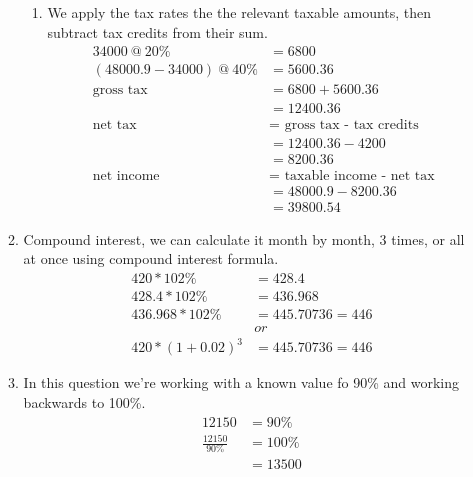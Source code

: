 \documentclass[11pt]{article}
\begin{document}
\begin{enumerate}
\begin{enumerate}
\begin{enumerate}
                    \item We apply the tax rates the the relevant taxable amounts, then subtract tax credits from their sum.
                        \begin{equation*}
                            \begin{split}
                                34000\ @\ 20\%&=6800\\
                                (48000.9-34000)\ @\ 40\%&=5600.36\\
                                \text{gross tax }&=6800+5600.36\\
                                &=12400.36\\
                                \text{net tax }&=\text{ gross tax - tax credits }\\
                                &=12400.36-4200\\
                                &=8200.36\\
                                \text{net income }&=\text{ taxable income - net tax}\\
                                &=48000.9-8200.36\\
                                &=39800.54
                            \end{split}
                        \end{equation*}
                \end{enumerate}
                \item Compound interest, we can calculate it month by month, 3 times, or all at once using compound interest formula.
                    \begin{equation*}
                        \begin{split}
                            420*102\%&=428.4\\
                            428.4*102\%&=436.968\\
                            436.968*102\%&=445.70736=446\\
                            &or\\
                            420*(1+0.02)^3&=445.70736=446
                        \end{split}
                    \end{equation*}
                \item In this question we're working with a known value fo 90\% and working backwards to 100\%.
                    \begin{equation*}
                        \begin{split}
                            12150&=90\%\\
                            \frac{12150}{90\%}&=100\%\\
                            &=13500
                        \end{split}
                    \end{equation*}
        \end{enumerate}


\end{enumerate}
\end{document}
